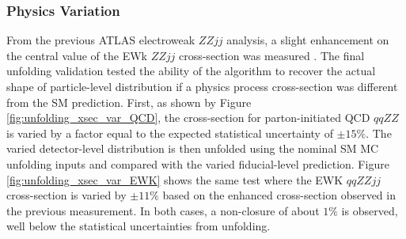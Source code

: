 \subsubsection{Physics Variation}
From the previous ATLAS electroweak $ZZjj$ analysis, a slight enhancement on the central value of the EWk $ZZjj$ cross-section was measured \cite{ATLASZZjj}. The final unfolding validation tested the ability of the algorithm to recover the actual shape of particle-level distribution if a physics process cross-section was different from the SM prediction. First, as shown by Figure \ref{fig:unfolding_xsec_var_QCD}, the cross-section for parton-initiated QCD $qqZZ$ is varied by a factor equal to the expected statistical uncertainty of $\pm  15\%$. The varied detector-level distribution is then unfolded using the nominal SM MC unfolding inputs and compared with the varied fiducial-level prediction. Figure \ref{fig:unfolding_xsec_var_EWK} shows the same test where the EWK $qqZZjj$ cross-section is varied by $\pm 11\%$ based on the enhanced cross-section observed in the previous measurement. In both cases, a non-closure of about $1\%$ is observed, well below the statistical uncertainties from unfolding.

